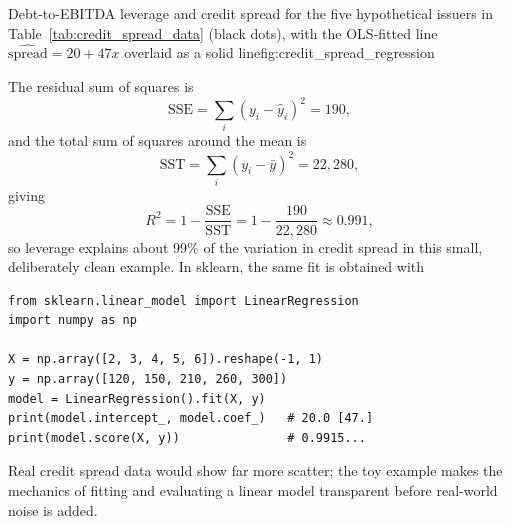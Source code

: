 \documentclass[../ai_in_finance]{subfiles}
\begin{document}
\begin{bookfigure}{Debt-to-EBITDA leverage and credit spread for the five hypothetical issuers in Table~\ref{tab:credit_spread_data} (black dots), with the OLS-fitted line $\widehat{\text{spread}}=20+47x$ overlaid as a solid line}{fig:credit_spread_regression}
\end{bookfigure}

The residual sum of squares is
$$\text{SSE} = \sum_i (y_i - \hat y_i)^2 = 190,$$ and the total sum of squares around the mean is
$$\text{SST} = \sum_i (y_i - \bar y)^2 = 22{,}280,$$
giving
\begin{equation*}
R^2 = 1 - \frac{\text{SSE}}{\text{SST}} = 1 - \frac{190}{22{,}280} \approx 0.991,
\end{equation*}
so leverage explains about 99\% of the variation in credit spread in this small, deliberately clean example. In sklearn, the same fit is obtained with

\begin{verbatim}
from sklearn.linear_model import LinearRegression
import numpy as np

X = np.array([2, 3, 4, 5, 6]).reshape(-1, 1)
y = np.array([120, 150, 210, 260, 300])
model = LinearRegression().fit(X, y)
print(model.intercept_, model.coef_)   # 20.0 [47.]
print(model.score(X, y))               # 0.9915...
\end{verbatim}

Real credit spread data would show far more scatter; the toy example makes the mechanics of fitting and evaluating a linear model transparent before real-world noise is added.
\end{document}
